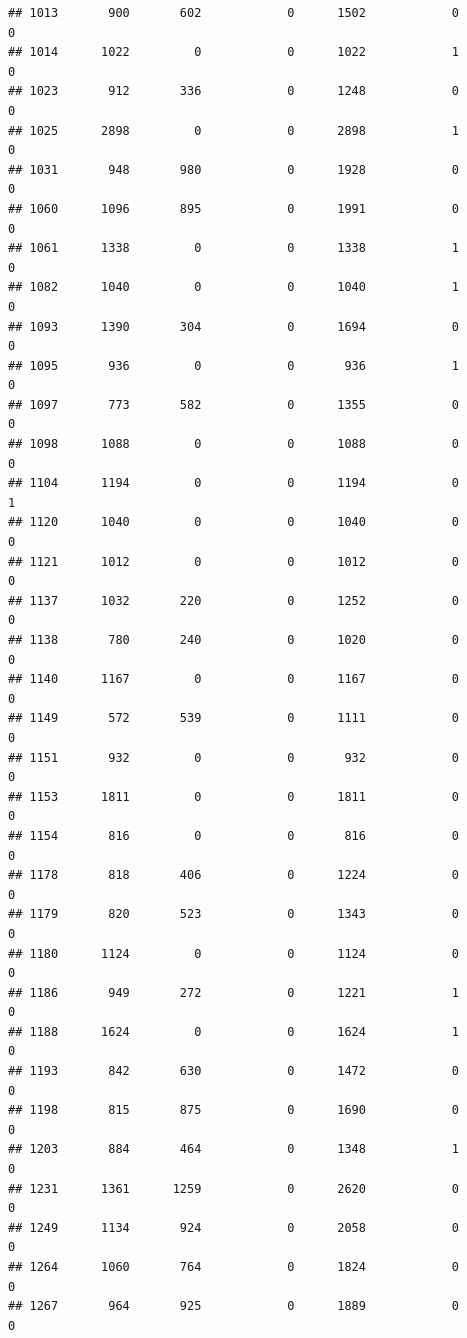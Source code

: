 \documentclass[]{article}
\begin{document}
\begin{verbatim}
## 1013       900       602            0      1502            0            0
## 1014      1022         0            0      1022            1            0
## 1023       912       336            0      1248            0            0
## 1025      2898         0            0      2898            1            0
## 1031       948       980            0      1928            0            0
## 1060      1096       895            0      1991            0            0
## 1061      1338         0            0      1338            1            0
## 1082      1040         0            0      1040            1            0
## 1093      1390       304            0      1694            0            0
## 1095       936         0            0       936            1            0
## 1097       773       582            0      1355            0            0
## 1098      1088         0            0      1088            0            0
## 1104      1194         0            0      1194            0            1
## 1120      1040         0            0      1040            0            0
## 1121      1012         0            0      1012            0            0
## 1137      1032       220            0      1252            0            0
## 1138       780       240            0      1020            0            0
## 1140      1167         0            0      1167            0            0
## 1149       572       539            0      1111            0            0
## 1151       932         0            0       932            0            0
## 1153      1811         0            0      1811            0            0
## 1154       816         0            0       816            0            0
## 1178       818       406            0      1224            0            0
## 1179       820       523            0      1343            0            0
## 1180      1124         0            0      1124            0            0
## 1186       949       272            0      1221            1            0
## 1188      1624         0            0      1624            1            0
## 1193       842       630            0      1472            0            0
## 1198       815       875            0      1690            0            0
## 1203       884       464            0      1348            1            0
## 1231      1361      1259            0      2620            0            0
## 1249      1134       924            0      2058            0            0
## 1264      1060       764            0      1824            0            0
## 1267       964       925            0      1889            0            0

\end{verbatim}
\end{document}
